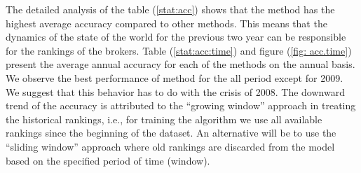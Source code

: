The detailed analysis of the table (\ref{stat:acc}) shows that the \rollsd{} method has the highest average accuracy compared to other methods. This means that the dynamics of the state of the world for the previous two year can be responsible for the rankings of the brokers. Table (\ref{stat:acc:time})  and figure (\ref{fig: acc.time}) present the average annual accuracy for each of the methods on the annual basis. We observe the best performance of \rollsd{} method for the all period except for 2009. We suggest that this behavior has to do with the crisis of 2008. The downward trend of the accuracy is attributed to the ``growing window'' approach in treating the historical rankings, i.e., for training the algorithm we use all available rankings since the beginning of the dataset. An alternative will be to use the ``sliding window'' approach where old rankings are discarded from the model based on the specified period of time (window). 



 



